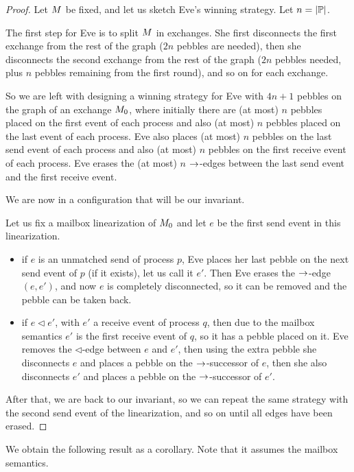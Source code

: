 \documentclass[a4paper,UKenglish,cleveref, autoref, thm-restate]{lipics-v2021}
\begin{document}
\begin{proof}
Let $M$ be fixed, and let us sketch Eve's winning strategy.
Let $n = |\mathbb{P}|$.

The first step for Eve is to split $M$ in exchanges. She first disconnects
the first exchange from the rest of the graph ($2n$ pebbles are needed),
then she disconnects the second exchange from the rest of the graph ($2n$ pebbles needed, plus $n$ pebbles remaining from the first round), and so on for
each exchange.

So we are left with designing a winning strategy for Eve with $4n+1$ pebbles
on the graph of an exchange $M_0$,
where initially there are (at most) $n$ pebbles
placed on the first event of each process and also (at most) $n$ pebbles placed
on the last event of each process. Eve also places (at most) $n$ pebbles on the last
send event of each process and also (at most) $n$ pebbles on the first receive event of
each process. Eve erases the (at most) $n$ $\to$-edges between the last send event and the first receive event.

We are now in a configuration that will be our invariant.

Let us fix a mailbox linearization of $M_0$
and let $e$ be the first send event in this linearization.
\begin{itemize}
\item if $e$ is an unmatched send of process $p$,
Eve places her last pebble on the next
send event of $p$ (if it exists), let us call it $e'$. Then Eve erases the
$\to$-edge $(e,e')$, and now $e$ is completely disconnected,
so it can be removed and the pebble can be taken back.
\item if $e\lhd e'$, with $e'$ a receive event of process $q$,
then due to the mailbox semantics $e'$ is the first receive event of $q$,
so it has a pebble placed on it. Eve removes the $\lhd$-edge between
$e$ and $e'$, then using the extra pebble she disconnects $e$ and places a
pebble on the $\to$-successor of $e$, then she also
disconnects $e'$ and places a pebble on the $\to$-successor of $e'$.
\end{itemize}
After that, we are back to our invariant, so we can repeat the same
strategy with the second send event of the linearization, and so on until
all edges have been erased.
\end{proof}

We obtain the following result as a corollary.
Note that it assumes the mailbox semantics.
\end{document}
